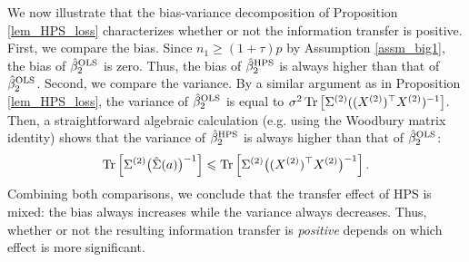 





We now illustrate that the bias-variance decomposition of Proposition \ref{lem_HPS_loss} characterizes whether or not the information transfer is positive.
First, we compare the bias. Since $n_1 \ge (1 + \tau) p$ by Assumption \ref{assm_big1}, the bias of $\hat{\beta}_2^{\textup{OLS}}$ is zero.
Thus, the bias of $\hat{\beta}_2^{\textup{HPS}}$ is always higher than that of $\hat{\beta}_2^{\textup{OLS}}$.
Second, we compare the variance. By a similar argument as in Proposition \ref{lem_HPS_loss}, the variance of $\hat{\beta}_2^{\textup{OLS}}$ is equal to $\sigma^2 \operatorname{Tr}\left[\Sigma^{(2)} ((X^{(2)})^{\top} X^{(2)})^{-1}\right]$.
Then, a straightforward algebraic calculation (e.g. using the Woodbury matrix identity) shows that the variance of $\hat{\beta}_2^{\textup{HPS}}$ is always higher than that of $\hat{\beta}_2^{\textup{OLS}}$:
\begin{align*}
    \operatorname{Tr}\left[\Sigma^{(2)} \big(\hat{\Sigma}(a)\big)^{-1}\right] \leqslant \operatorname{Tr}\left[\Sigma^{(2)} \big((X^{(2)})^{\top} X^{(2)}\big)^{-1}\right].
\end{align*}
Combining both comparisons, we conclude that the transfer effect of HPS is mixed: the bias always increases while the variance always decreases.
Thus, whether or not the resulting information transfer is \textit{positive} depends on which effect is more significant.





